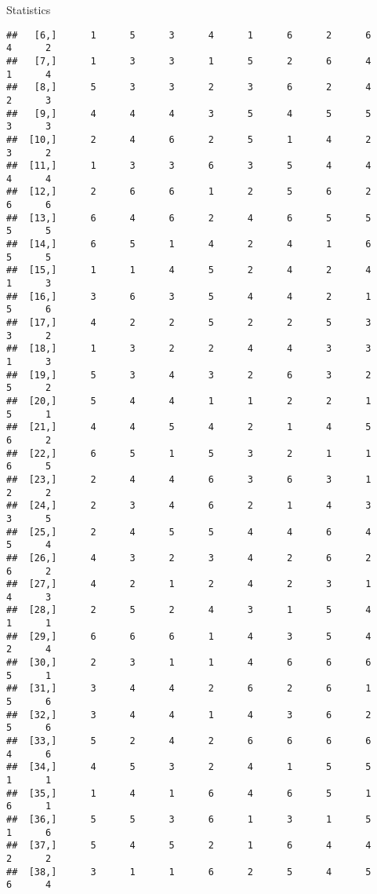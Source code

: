 \documentclass[
  ignorenonframetext,
]{beamer}
\begin{document}
\begin{frame}[fragile]{Statistics}
\begin{verbatim}
##   [6,]      1      5      3      4      1      6      2      6      4      2
##   [7,]      1      3      3      1      5      2      6      4      1      4
##   [8,]      5      3      3      2      3      6      2      4      2      3
##   [9,]      4      4      4      3      5      4      5      5      3      3
##  [10,]      2      4      6      2      5      1      4      2      3      2
##  [11,]      1      3      3      6      3      5      4      4      4      4
##  [12,]      2      6      6      1      2      5      6      2      6      6
##  [13,]      6      4      6      2      4      6      5      5      5      5
##  [14,]      6      5      1      4      2      4      1      6      5      5
##  [15,]      1      1      4      5      2      4      2      4      1      3
##  [16,]      3      6      3      5      4      4      2      1      5      6
##  [17,]      4      2      2      5      2      2      5      3      3      2
##  [18,]      1      3      2      2      4      4      3      3      1      3
##  [19,]      5      3      4      3      2      6      3      2      5      2
##  [20,]      5      4      4      1      1      2      2      1      5      1
##  [21,]      4      4      5      4      2      1      4      5      6      2
##  [22,]      6      5      1      5      3      2      1      1      6      5
##  [23,]      2      4      4      6      3      6      3      1      2      2
##  [24,]      2      3      4      6      2      1      4      3      3      5
##  [25,]      2      4      5      5      4      4      6      4      5      4
##  [26,]      4      3      2      3      4      2      6      2      6      2
##  [27,]      4      2      1      2      4      2      3      1      4      3
##  [28,]      2      5      2      4      3      1      5      4      1      1
##  [29,]      6      6      6      1      4      3      5      4      2      4
##  [30,]      2      3      1      1      4      6      6      6      5      1
##  [31,]      3      4      4      2      6      2      6      1      5      6
##  [32,]      3      4      4      1      4      3      6      2      5      6
##  [33,]      5      2      4      2      6      6      6      6      4      6
##  [34,]      4      5      3      2      4      1      5      5      1      1
##  [35,]      1      4      1      6      4      6      5      1      6      1
##  [36,]      5      5      3      6      1      3      1      5      1      6
##  [37,]      5      4      5      2      1      6      4      4      2      2
##  [38,]      3      1      1      6      2      5      4      5      6      4

\end{verbatim}
\end{frame}
\end{document}
